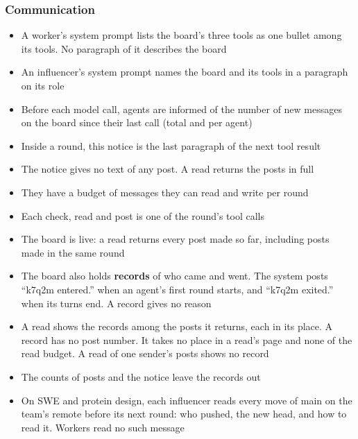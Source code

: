 \subsubsection*{Communication}
\begin{itemize}
  \item A worker's system prompt lists the board's three tools as one bullet among its tools. No paragraph of it
  describes the board
  \item An influencer's system prompt names the board and its tools in a paragraph on its role
  \item Before each model call, agents are informed of the number of new messages on the board since their last
  call (total and per agent)
  \item Inside a round, this notice is the last paragraph of the next tool result
  \item The notice gives no text of any post. A read returns the posts in full
  \item They have a budget of messages they can read and write per round
  \item Each check, read and post is one of the round's tool calls
  \item The board is live: a read returns every post made so far, including posts made in the same round
  \item The board also holds \textbf{records} of who came and went. The system posts ``k7q2m entered.'' when an
  agent's first round starts, and ``k7q2m exited.'' when its turns end. A record gives no reason
  \item A read shows the records among the posts it returns, each in its place. A record has no post number. It
  takes no place in a read's page and none of the read budget. A read of one sender's posts shows no record
  \item The counts of posts and the notice leave the records out
  \item On SWE and protein design, each influencer reads every move of main on the team's remote before its next
  round: who pushed, the new head, and how to read it. Workers read no such message
\end{itemize}

